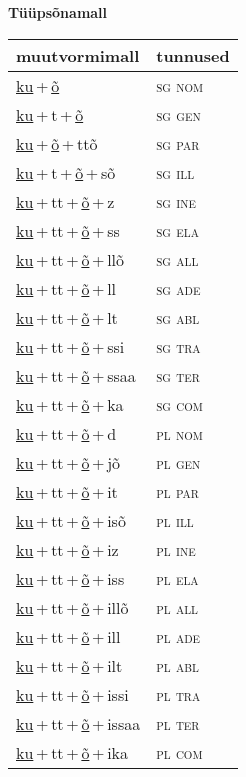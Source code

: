 
\vspace{1.8em}
\begin{minipage}{\textwidth}
\textbf{Tüüpsõnamall \,}\\

\begin{sideways}
\begin{tabular}{l l}
muutvormimall & tunnused \\
\hline
\underline{ku}\,+\,\underline{õ} & \textsc{ sg nom } \\
\underline{ku}\,+\,t\,+\,\underline{õ} & \textsc{ sg gen } \\
\underline{ku}\,+\,\underline{õ}\,+\,ttõ & \textsc{ sg par } \\
\underline{ku}\,+\,t\,+\,\underline{õ}\,+\,sõ & \textsc{ sg ill } \\
\underline{ku}\,+\,tt\,+\,\underline{õ}\,+\,z & \textsc{ sg ine } \\
\underline{ku}\,+\,tt\,+\,\underline{õ}\,+\,ss & \textsc{ sg ela } \\
\underline{ku}\,+\,tt\,+\,\underline{õ}\,+\,llõ & \textsc{ sg all } \\
\underline{ku}\,+\,tt\,+\,\underline{õ}\,+\,ll & \textsc{ sg ade } \\
\underline{ku}\,+\,tt\,+\,\underline{õ}\,+\,lt & \textsc{ sg abl } \\
\underline{ku}\,+\,tt\,+\,\underline{õ}\,+\,ssi & \textsc{ sg tra } \\
\underline{ku}\,+\,tt\,+\,\underline{õ}\,+\,ssaa & \textsc{ sg ter } \\
\underline{ku}\,+\,tt\,+\,\underline{õ}\,+\,ka & \textsc{ sg com } \\
\underline{ku}\,+\,tt\,+\,\underline{õ}\,+\,d & \textsc{ pl nom } \\
\underline{ku}\,+\,tt\,+\,\underline{õ}\,+\,jõ & \textsc{ pl gen } \\
\underline{ku}\,+\,tt\,+\,\underline{õ}\,+\,it & \textsc{ pl par } \\
\underline{ku}\,+\,tt\,+\,\underline{õ}\,+\,isõ & \textsc{ pl ill } \\
\underline{ku}\,+\,tt\,+\,\underline{õ}\,+\,iz & \textsc{ pl ine } \\
\underline{ku}\,+\,tt\,+\,\underline{õ}\,+\,iss & \textsc{ pl ela } \\
\underline{ku}\,+\,tt\,+\,\underline{õ}\,+\,illõ & \textsc{ pl all } \\
\underline{ku}\,+\,tt\,+\,\underline{õ}\,+\,ill & \textsc{ pl ade } \\
\underline{ku}\,+\,tt\,+\,\underline{õ}\,+\,ilt & \textsc{ pl abl } \\
\underline{ku}\,+\,tt\,+\,\underline{õ}\,+\,issi & \textsc{ pl tra } \\
\underline{ku}\,+\,tt\,+\,\underline{õ}\,+\,issaa & \textsc{ pl ter } \\
\underline{ku}\,+\,tt\,+\,\underline{õ}\,+\,ika & \textsc{ pl com } \\
\end{tabular}
\end{sideways}
\label{tab:tüüpsõnamall-kuõ}


\end{minipage}
